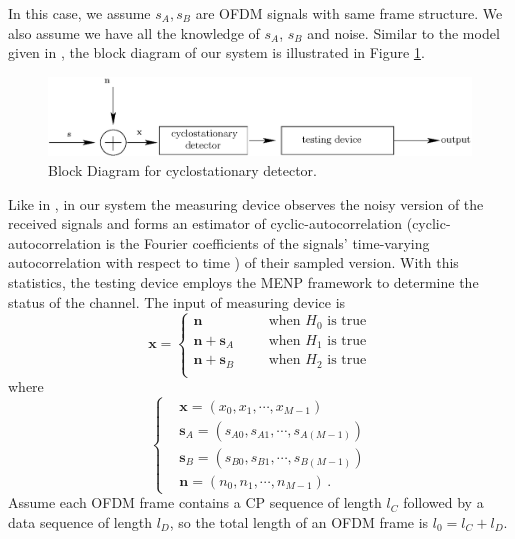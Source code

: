 In this case, we assume $s_A, s_B$ are OFDM signals with same frame structure.
We also assume we have all the knowledge of $s_A$, $s_B$ and noise.   
Similar to the model given in \cite{lunden2007spectrum, lunden2010robust}, the block diagram of our system is illustrated in Figure \ref{pic:1222a0}.
\begin{figure}[!t]
  \centering 
  \includegraphics[width=\textwidth]{4/fig1.eps}
  \caption{Block Diagram for  cyclostationary detector.}
  \label{pic:1222a0}
\end{figure}
Like in \cite{lunden2007spectrum, lunden2010robust}, in our system the measuring device observes the noisy version of the received signals and forms an estimator of cyclic-autocorrelation (cyclic-autocorrelation is the Fourier coefficients of the signals' time-varying autocorrelation with respect to time \cite{dandawate1994statistical, lunden2007spectrum, lunden2010robust}) of their sampled version. With this statistics, the testing device employs the MENP framework to determine the status of the channel. The input of measuring device is
\begin{equation}
  \mathbf{x} = \begin{cases}
	\mathbf{n}\;\;\;\;\;\;&\text{when $H_0$ is true}\\
	\mathbf{n}+\mathbf{s}_A\;\;\;\;\;\;&\text{when $H_1$ is true}\\
	\mathbf{n}+\mathbf{s}_B\;\;\;\;\;\;&\text{when $H_2$ is true}\\
  \end{cases}
  \label{equ:1209a1}
\end{equation}
where 
\begin{equation}
  \begin{cases}
	&\mathbf{x} = (x_0, x_1, \cdots, x_{M-1})\\
	&\mathbf{s}_A = (s_{A0}, s_{A1}, \cdots, s_{A(M-1)})\\
	&\mathbf{s}_B = (s_{B0}, s_{B1}, \cdots, s_{B(M-1)})\\
	&\mathbf{n} = (n_{0}, n_{1}, \cdots, n_{M-1})\,.
  \end{cases}
  \label{xssn}
\end{equation}
Assume each OFDM frame contains a CP sequence of length $l_C$ followed by a data sequence of length $l_D$, so the total length of an OFDM frame is $l_0 = l_C+l_D$. 
